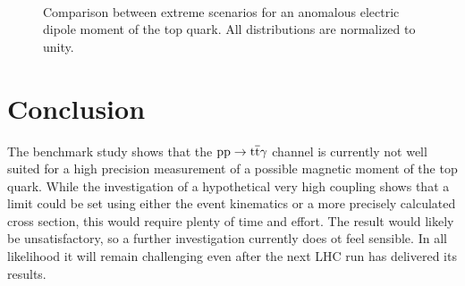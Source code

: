 \begin{figure}
\centering
  \\
  \caption{Comparison between extreme scenarios for an anomalous electric dipole moment of the top quark. All distributions are normalized to unity.}
  \label{fig_ano_comp_ex}
\end{figure}

\section{Conclusion}

The benchmark study shows that the $\mathrm{pp} \to \mathrm{t}\overline{\mathrm{t}} \gamma$ channel is currently not well suited for a high precision measurement of a possible magnetic moment of the top quark. While the investigation of a hypothetical very high coupling shows that a limit could be set using either the event kinematics or a more precisely calculated cross section, this would require plenty of time and effort. The result would likely be unsatisfactory, so a further investigation  currently does ot feel sensible. In all likelihood it will remain challenging even after the next LHC run has delivered its results. 